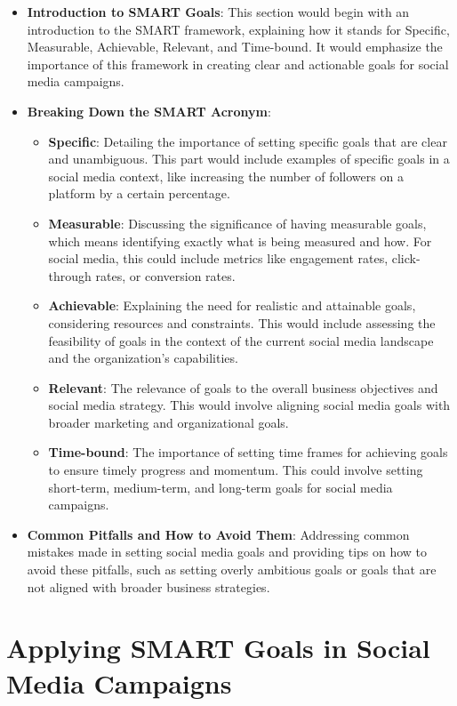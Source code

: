 \documentclass[
]{book}
\providecommand{\tightlist}{%
  \setlength{\itemsep}{0pt}\setlength{\parskip}{0pt}}
\begin{document}
\begin{itemize}
\tightlist
\item
  \textbf{Introduction to SMART Goals}: This section would begin with an introduction to the SMART framework, explaining how it stands for Specific, Measurable, Achievable, Relevant, and Time-bound. It would emphasize the importance of this framework in creating clear and actionable goals for social media campaigns.
\item
  \textbf{Breaking Down the SMART Acronym}:

  \begin{itemize}
  \tightlist
  \item
    \textbf{Specific}: Detailing the importance of setting specific goals that are clear and unambiguous. This part would include examples of specific goals in a social media context, like increasing the number of followers on a platform by a certain percentage.
  \item
    \textbf{Measurable}: Discussing the significance of having measurable goals, which means identifying exactly what is being measured and how. For social media, this could include metrics like engagement rates, click-through rates, or conversion rates.
  \item
    \textbf{Achievable}: Explaining the need for realistic and attainable goals, considering resources and constraints. This would include assessing the feasibility of goals in the context of the current social media landscape and the organization's capabilities.
  \item
    \textbf{Relevant}: The relevance of goals to the overall business objectives and social media strategy. This would involve aligning social media goals with broader marketing and organizational goals.
  \item
    \textbf{Time-bound}: The importance of setting time frames for achieving goals to ensure timely progress and momentum. This could involve setting short-term, medium-term, and long-term goals for social media campaigns.
  \end{itemize}
\item
  \textbf{Common Pitfalls and How to Avoid Them}: Addressing common mistakes made in setting social media goals and providing tips on how to avoid these pitfalls, such as setting overly ambitious goals or goals that are not aligned with broader business strategies.
\end{itemize}

\hypertarget{applying-smart-goals-in-social-media-campaigns}{%
\section*{Applying SMART Goals in Social Media Campaigns}\label{applying-smart-goals-in-social-media-campaigns}}
\end{document}
